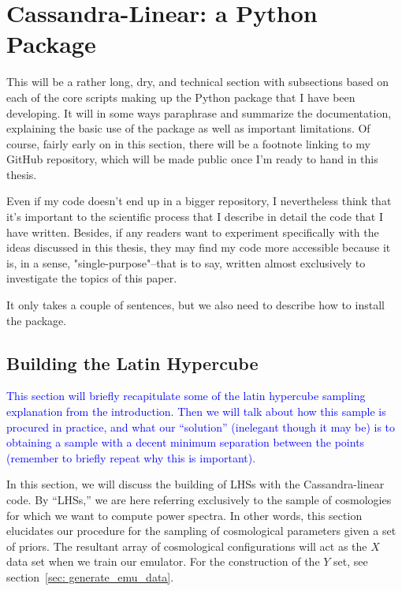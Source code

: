 \chapter{Cassandra-Linear: a Python Package}

This will be a rather long, dry, and technical section with subsections based on each of the core scripts making up the Python package that I have been developing. It will in some ways paraphrase and summarize the documentation, explaining the basic use of the package as well as important limitations. Of course, fairly early on in this section, there will be a footnote linking to my GitHub repository, which will be made public once I'm ready to hand in this thesis.

Even if my code doesn't end up in a bigger repository, I nevertheless think that it's important to the scientific process that I describe in detail the code that I have written. Besides, if any readers want to experiment specifically with the ideas discussed in this thesis, they may find my code more accessible because it is, in a sense, "single-purpose"--that is to say, written almost exclusively to investigate the topics of this paper.

It only takes a couple of sentences, but we also need to describe how to install the package.


\section{Building the Latin Hypercube}
\label{sec: build_lhc}


\textcolor{blue}{This section will briefly recapitulate some of the latin hypercube sampling
explanation from the introduction. Then we will talk about how this sample is
procured in practice, and what our ``solution'' (inelegant though it may be)
is to obtaining a sample with a decent minimum separation between the points
(remember to briefly repeat why this is important).}

In this section, we will discuss the building of LHSs with the
Cassandra-linear code. By ``LHSs,'' we are here referring exclusively to the
sample of cosmologies for which we want to compute power spectra. In other 
words, this section elucidates our procedure for the sampling of cosmological 
parameters given a set of priors. The resultant array of cosmological
configurations will act as the $X$ data set when we train our emulator. For 
the construction of the $Y$ set, see section~\ref{sec: generate_emu_data}.

